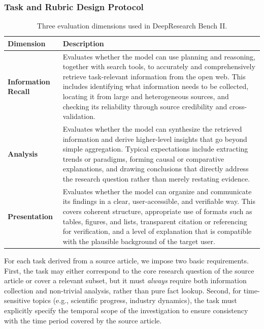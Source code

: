 \documentclass[11pt]{article}
\begin{document}
\subsubsection{Task and Rubric Design Protocol}
\label{sec:task-rubric-requirements}

\begin{table}[h]
  \centering
  \small
  \begin{tabular}{p{}p{}}
    \rowcolor{accent!15}
    \textbf{\textcolor{accent}{Dimension}} & \textbf{\textcolor{accent}{Description}} \\
    \toprule
    \textbf{Information Recall} & Evaluates whether the model can use planning and reasoning, together with search tools, to accurately and comprehensively retrieve task-relevant information from the open web. This includes identifying what information needs to be collected, locating it from large and heterogeneous sources, and checking its reliability through source credibility and cross-validation. \\
    \addlinespace[0.4em]
    \textbf{Analysis} & Evaluates whether the model can synthesize the retrieved information and derive higher-level insights that go beyond simple aggregation. Typical expectations include extracting trends or paradigms, forming causal or comparative explanations, and drawing conclusions that directly address the research question rather than merely restating evidence. \\
    \addlinespace[0.4em]
    \textbf{Presentation} & Evaluates whether the model can organize and communicate its findings in a clear, user-accessible, and verifiable way. This covers coherent structure, appropriate use of formats such as tables, figures, and lists, transparent citation or referencing for verification, and a level of explanation that is compatible with the plausible background of the target user. \\
    \bottomrule
  \end{tabular}
  \caption{Three evaluation dimensions used in DeepResearch Bench II.}
  \label{tab:dimensions}
\end{table}

For each task derived from a source article, we impose two basic requirements. 
First, the task may either correspond to the core research question of the source article or cover a relevant subset, but it must \emph{always} require both information collection and non-trivial analysis, rather than pure fact lookup. 
Second, for time-sensitive topics (e.g., scientific progress, industry dynamics), the task must explicitly specify the temporal scope of the investigation to ensure consistency with the time period covered by the source article.
\end{document}
